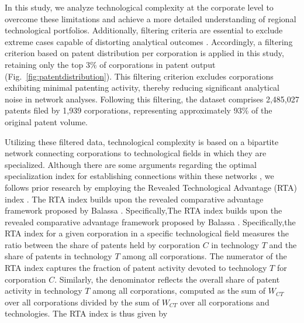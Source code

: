 In this study, we analyze technological complexity at the corporate level to overcome these limitations and achieve a more detailed understanding of regional technological portfolios. 
Additionally, filtering criteria are essential to exclude extreme cases capable of distorting analytical outcomes \cite{Hidalgo2021,PintarScherngell2022}. Accordingly, a filtering criterion based on patent distribution per corporation  is applied in this study, retaining only the top 3\% of corporations in patent output (Fig.~\ref{fig:patentdistribution}). This filtering criterion excludes corporations exhibiting minimal patenting activity, thereby reducing significant analytical noise in network analyses. Following this filtering, the dataset comprises 2,485,027 patents filed by 1,939 corporations, representing approximately 93\% of the original patent volume.

Utilizing these filtered data, technological complexity is based on a bipartite network connecting corporations to technological fields in which they are specialized. Although there are some arguments regarding the optimal specialization index for establishing connections within these networks \cite{PintarScherngell2022}, we follows prior research by employing the Revealed Technological Advantage (RTA) index \cite{Soete1987}.
The RTA index builds upon the revealed comparative advantage framework proposed by Balassa \cite{Balassa1965}. Specifically,The RTA index builds upon the revealed comparative advantage framework proposed by Balassa \cite{Balassa1965}. 
Specifically,the RTA index for a given corporation in a specific technological field measures the ratio between the share of patents held by corporation \(C\) in technology \(T\) and the share of patents in technology \(T\) among all corporations.
The numerator of the RTA index captures the fraction of patent activity devoted to technology \(T\) for corporation \(C\). 
Similarly, the denominator reflects the overall share of patent activity in technology \(T\) among all corporations, computed as the sum of \(W_{CT}\) over all corporations divided by the sum of \(W_{CT}\) over all corporations and technologies.
The RTA index is thus given by

